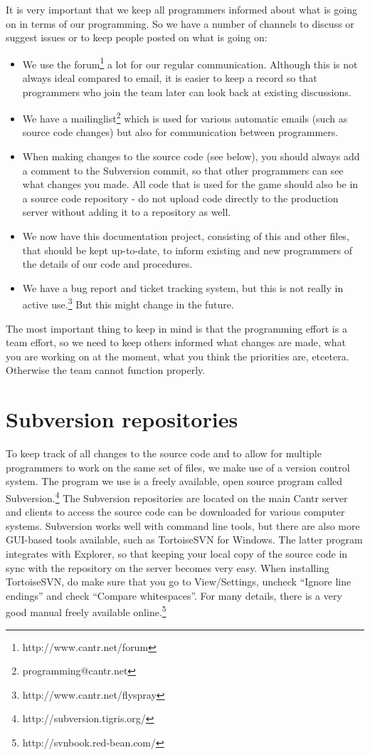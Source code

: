 \documentclass[a4paper,12pt]{article}
\begin{document}
It is very important that we keep all programmers informed about what is going on in terms of our programming. So we have a number of channels to discuss or suggest issues or to keep people posted on what is going on:
\begin{itemize}
\item We use the forum\footnote{http://www.cantr.net/forum} a lot for our regular communication. Although this is not always ideal compared to email, it is easier to keep a record so that programmers who join the team later can look back at existing discussions.
\item We have a mailinglist\footnote{programming@cantr.net} which is used for various automatic emails (such as source code changes) but also for communication between programmers.
\item When making changes to the source code (see below), you should always add a comment to the Subversion commit, so that other programmers can see what changes you made. All code that is used for the game should also be in a source code repository - do not upload code directly to the production server without adding it to a repository as well.
\item We now have this documentation project, consisting of this and other files, that should be kept up-to-date, to inform existing and new programmers of the details of our code and procedures.
\item We have a bug report and ticket tracking system, but this is not really in active use.\footnote{http://www.cantr.net/flyspray} But this might change in the future.
\end{itemize}

The most important thing to keep in mind is that the programming effort is a team effort, so we need to keep others informed what changes are made, what you are working on at the moment, what you think the priorities are, etcetera. Otherwise the team cannot function properly.

\section{Subversion repositories}

To keep track of all changes to the source code and to allow for multiple programmers to work on the same set of files, we make use of a version control system. The program we use is a freely available, open source program called Subversion.\footnote{http://subversion.tigris.org/} The Subversion repositories are located on the main Cantr server and clients to access the source code can be downloaded for various computer systems. Subversion works well with command line tools, but there are also more GUI-based tools available, such as TortoiseSVN for Windows. The latter program integrates with Explorer, so that keeping your local copy of the source code in sync with the repository on the server becomes very easy. When installing TortoiseSVN, do make sure that you go to View/Settings, uncheck ``Ignore line endings'' and check ``Compare whitespaces''. For many details, there is a very good manual freely available online.\footnote{http://svnbook.red-bean.com/}
\end{document}
